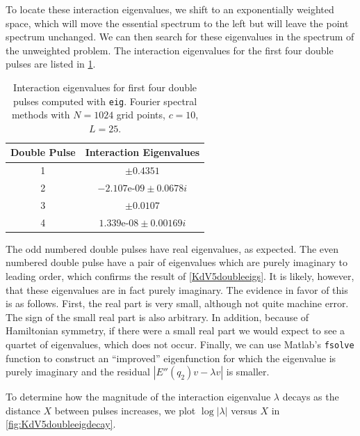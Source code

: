 \documentclass[thesis.tex]{subfiles}
\begin{document}
To locate these interaction eigenvalues, we shift to an exponentially weighted space, which will move the essential spectrum to the left but will leave the point spectrum unchanged. We can then search for these eigenvalues in the spectrum of the unweighted problem. The interaction eigenvalues for the first four double pulses are listed in \cref{table:KdV5inteigs}.

\begin{table}
\centering
\begin{tabular}{|c|c|} 
 \hline
 Double Pulse & Interaction Eigenvalues \\
 \hline
 1 & $\pm 0.4351$ \\
 2 & $-2.107\text{e-}09 \pm 0.0678 i$ \\
 3 & $\pm 0.0107$ \\
 4 & $1.339\text{e-}08 \pm 0.00169 i$ \\
 \hline
\end{tabular}
\caption{Interaction eigenvalues for first four double pulses computed with \texttt{eig}. Fourier spectral methods with $N = 1024$ grid points, $c = 10$, $L = 25$.}
\label{table:KdV5inteigs}
\end{table}

The odd numbered double pulses have real eigenvalues, as expected. The even numbered double pulse have a pair of eigenvalues which are purely imaginary to leading order, which confirms the result of \cref{KdV5doubleeigs}. It is likely, however, that these eigenvalues are in fact purely imaginary. The evidence in favor of this is as follows. First, the real part is very small, although not quite machine error. The sign of the small real part is also arbitrary. In addition, because of Hamiltonian symmetry, if there were a small real part we would expect to see a quartet of eigenvalues, which does not occur. Finally, we can use Matlab's \texttt{fsolve} function to construct an ``improved'' eigenfunction for which the eigenvalue is purely imaginary and the residual $|E''(q_2)v - \lambda v|$ is smaller.

To determine how the magnitude of the interaction eigenvalue $\lambda$ decays as the distance $X$ between pulses increases, we plot $\log |\lambda|$ versus $X$ in \cref{fig:KdV5doubleeigdecay}. 
\end{document}
